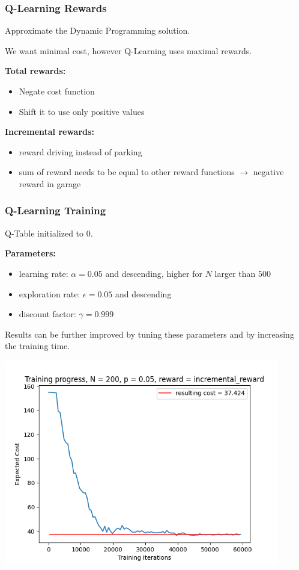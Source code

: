 \documentclass{beamer}
\begin{document}
\begin{frame}
	\frametitle{Q-Learning Rewards}
	\vspace{-0.3cm}
	Approximate the Dynamic Programming solution.
	
	\vspace{0.3cm}
	We want minimal cost, however Q-Learning uses maximal rewards.
	\vspace{0.3cm}
	
	\textbf{Total rewards:}
	\begin{itemize}
		\item Negate cost function
		\item Shift it to use only positive values
	\end{itemize}
	\textbf{Incremental rewards:}
	\begin{itemize}
		\item reward driving instead of parking
		\item sum of reward needs to be equal to other reward functions $\rightarrow$ negative reward in garage
	\end{itemize}
\end{frame}

\begin{frame}
	\frametitle{Q-Learning Training}
	\vspace{-0.3cm}
	Q-Table initialized to $0$.
	\vspace{0.3cm}
	
	\textbf{Parameters:}
	\begin{itemize}
		\item learning rate: $\alpha = 0.05$ and descending, higher for $N$ larger than $500$
		\item exploration rate: $\epsilon = 0.05$ and descending 
		\item discount factor: $\gamma = 0.999$ 
	\end{itemize}
	Results can be further improved by tuning these parameters and by increasing the training time.
\end{frame}

\begin{frame}
	\includegraphics[width=0.9\textwidth]{figures/q_training_progress_200.png}
\end{frame}
\end{document}
